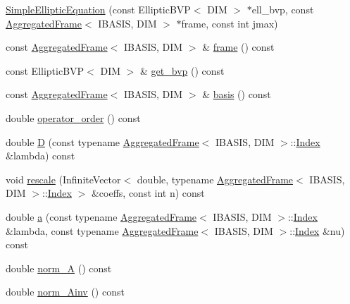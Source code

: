\begin{CompactItemize}
\item 
\hyperlink{classFrameTL_1_1SimpleEllipticEquation_d043ab2f1d2d62e13a2241ec148a10a2}{SimpleEllipticEquation} (const EllipticBVP$<$ DIM $>$ $\ast$ell\_\-bvp, const \hyperlink{classFrameTL_1_1AggregatedFrame}{AggregatedFrame}$<$ IBASIS, DIM $>$ $\ast$frame, const int jmax)
\item 
const \hyperlink{classFrameTL_1_1AggregatedFrame}{AggregatedFrame}$<$ IBASIS, DIM $>$ \& \hyperlink{classFrameTL_1_1SimpleEllipticEquation_21d88cf95981a8f5c3187c7339491b41}{frame} () const 
\item 
const EllipticBVP$<$ DIM $>$ \& \hyperlink{classFrameTL_1_1SimpleEllipticEquation_d1559772cff60c00487587b4a160a60f}{get\_\-bvp} () const 
\item 
const \hyperlink{classFrameTL_1_1AggregatedFrame}{AggregatedFrame}$<$ IBASIS, DIM $>$ \& \hyperlink{classFrameTL_1_1SimpleEllipticEquation_b0d14a3117004cec09cca7b665c962d0}{basis} () const 
\item 
double \hyperlink{classFrameTL_1_1SimpleEllipticEquation_b630525bc26c31fd7fd241c2d31fd4c8}{operator\_\-order} () const 
\item 
double \hyperlink{classFrameTL_1_1SimpleEllipticEquation_7fa64961d69cccd58143f6908eccb8b4}{D} (const typename \hyperlink{classFrameTL_1_1AggregatedFrame}{AggregatedFrame}$<$ IBASIS, DIM $>$::\hyperlink{classFrameTL_1_1FrameIndex}{Index} \&lambda) const 
\item 
void \hyperlink{classFrameTL_1_1SimpleEllipticEquation_df7e344f9567c74f5c6e34c3b6942937}{rescale} (InfiniteVector$<$ double, typename \hyperlink{classFrameTL_1_1AggregatedFrame}{AggregatedFrame}$<$ IBASIS, DIM $>$::\hyperlink{classFrameTL_1_1FrameIndex}{Index} $>$ \&coeffs, const int n) const 
\item 
double \hyperlink{classFrameTL_1_1SimpleEllipticEquation_472d73dad42588a253df3c51a8ed08c4}{a} (const typename \hyperlink{classFrameTL_1_1AggregatedFrame}{AggregatedFrame}$<$ IBASIS, DIM $>$::\hyperlink{classFrameTL_1_1FrameIndex}{Index} \&lambda, const typename \hyperlink{classFrameTL_1_1AggregatedFrame}{AggregatedFrame}$<$ IBASIS, DIM $>$::\hyperlink{classFrameTL_1_1FrameIndex}{Index} \&nu) const 
\item 
double \hyperlink{classFrameTL_1_1SimpleEllipticEquation_6d728f871244c8cb079e58eaca8c2402}{norm\_\-A} () const 
\item 
double \hyperlink{classFrameTL_1_1SimpleEllipticEquation_4c74106d2957712ae44948082f2a92d5}{norm\_\-Ainv} () const 
\item 

\end{CompactItemize}
